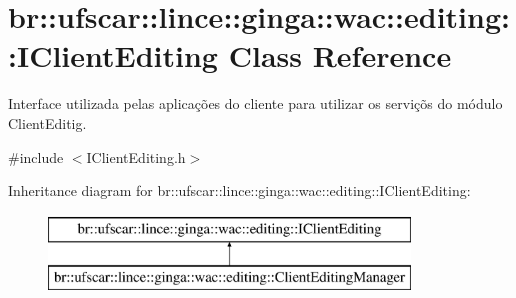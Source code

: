 \hypertarget{classbr_1_1ufscar_1_1lince_1_1ginga_1_1wac_1_1editing_1_1IClientEditing}{
\section{br::ufscar::lince::ginga::wac::editing::IClientEditing Class Reference}
\label{classbr_1_1ufscar_1_1lince_1_1ginga_1_1wac_1_1editing_1_1IClientEditing}
}


Interface utilizada pelas aplicações do cliente para utilizar os serviçõs do módulo ClientEditig.  




{\ttfamily \#include $<$IClientEditing.h$>$}

Inheritance diagram for br::ufscar::lince::ginga::wac::editing::IClientEditing:\begin{figure}[H]
\begin{center}
\leavevmode
\includegraphics[height=2cm]{classbr_1_1ufscar_1_1lince_1_1ginga_1_1wac_1_1editing_1_1IClientEditing}
\end{center}
\end{figure}
